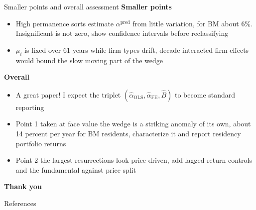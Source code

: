 \documentclass[aspectratio=169,10pt]{beamer}
\def\hibl{\textcolor{goetheblue}}
\def\hird{\textcolor{accentred}}
\newcommand{\svs}{\vspace{0.18cm}}
\newcommand{\bit}{\begin{itemize}}
\newcommand{\eit}{\end{itemize}}
\newcommand{\lead}[1]{{\bfseries #1}\par\nopagebreak}
\newcommand{\apred}{\alpha^{\text{pred}}}
\begin{document}
\begin{frame}{Smaller points and overall assessment}
\svs
\lead{Smaller points}
\bit\itemsep2pt
  \item High permanence sorts estimate $\apred$ from little variation, for BM about \hird{6\%}. Insignificant is not zero, show confidence intervals before reclassifying
  \item $\mu_i$ is fixed over \hibl{61 years} while firm types drift, decade interacted firm effects would bound the slow moving part of the wedge
\eit
\svs
\lead{Overall}
\bit\itemsep2pt
  \item A \hibl{great paper}! I expect the triplet $(\hat\alpha_{\text{OLS}},\hat\alpha_{\text{FE}},\hat B)$ to become standard reporting
  \item Point 1 \quad taken at face value the wedge is a striking anomaly of its own, about 14 percent per year for BM residents, characterize it and report residency portfolio returns
  \item Point 2 \quad the largest resurrections look price-driven, add lagged return controls and the fundamental against price split
\eit
\vfill
\begin{center}{\color{goetheblue}\textbf{Thank you}}\end{center}
\vfill
\end{frame}

\begin{frame}[allowframebreaks]{References}
\small
\printbibliography[heading=none]
\end{frame}
\end{document}
